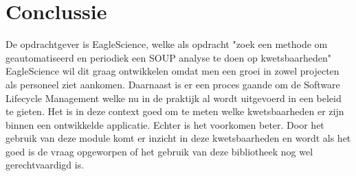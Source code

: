\chapter{Conclussie}\label{ch:opdrachtconclussie}

De opdrachtgever is EagleScience, welke als opdracht "zoek een methode om geautomatiseerd en periodiek een SOUP analyse te doen op kwetsbaarheden" EagleScience wil dit graag ontwikkelen omdat men een groei in zowel projecten als personeel ziet aankomen. Daarnaast is er een proces gaande om de Software Lifecycle Management welke nu in de praktijk al wordt uitgevoerd in een beleid te gieten. Het is in deze context goed om te meten welke kwetsbaarheden er zijn binnen een ontwikkelde applicatie. Echter is het voorkomen beter. Door het gebruik van deze module komt er inzicht in deze kwetsbaarheden en wordt als het goed is  de vraag opgeworpen of het gebruik van deze bibliotheek nog wel gerechtvaardigd is.


